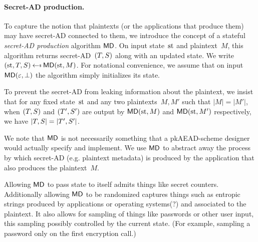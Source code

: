 \paragraph{Secret-AD production. } To capture the notion that plaintexts (or the applications that produce them) may have secret-AD connected to them, we introduce the concept of a stateful \emph{secret-AD production} algorithm $\mathsf{MD}$.  On input state~$\mathrm{st}$ and plaintext~$M$, this algorithm returns secret-AD~$(T,S)$ along with an updated state.  We write $(\st,\umd,\rmd) \getsr \mdalg(\st,M)$.  
For notational convenience, we assume that on input $\mathsf{MD}(\varepsilon,\bot)$ the algorithm simply initializes its state. 

To prevent the secret-AD from leaking information about the plaintext, we insist that for any fixed state~$\mathrm{st}$ and any two plaintexts~$M,M'$ such that $|M|=|M'|$, when $(T,S)$ and $(T',S')$ are output by $\mathsf{MD}(\mathrm{st},M)$ and $\mathsf{MD}(\mathrm{st},M')$ respectively, we have $|T,S|=|T',S'|$. 

We note that $\mathsf{MD}$ is not necessarily something that a pkAEAD-scheme designer would actually specify and implement.  We use $\mathsf{MD}$ to abstract away the process by which secret-AD (e.g. plaintext metadata) is produced by the application that also produces the plaintext~$M$. 

Allowing $\mathsf{MD}$ to pass state to itself admits things like secret counters.  Additionally allowing $\mathsf{MD}$ to be randomized captures things such as entropic strings produced by applications or operating systems(?) and associated to the plaintext.  It also allows for sampling of things like passwords or other user input, this sampling possibly controlled by the current state.  (For example, sampling a password only on the first encryption call.)




